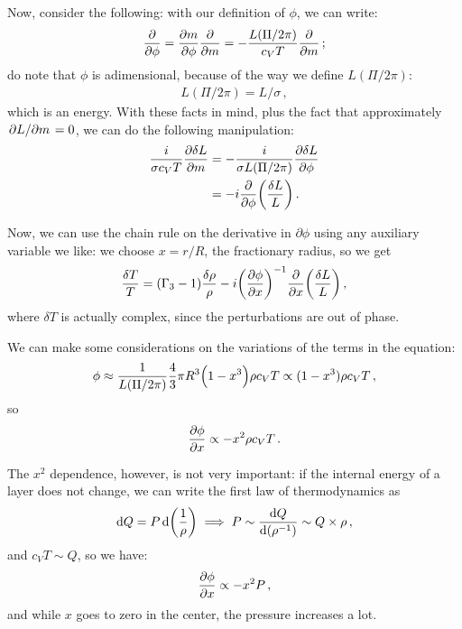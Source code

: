 \documentclass[main.tex]{subfiles}
\begin{document}
Now, consider the following: with our definition of \(\phi \), we can write: 
%
\begin{align}
\pdv{}{\phi } = \pdv{m}{\phi } \pdv{}{m}
= - \frac{L(\Pi /2\pi )}{c_V T} \pdv{}{m}
\,;
\end{align}
%
do note that \(\phi \) is adimensional, because of the way we define \(L(\Pi / 2 \pi )\):
%
\begin{align}
L(\Pi / 2\pi ) = L / \sigma 
\,,
\end{align}
%
which is an energy. With these facts in mind, plus the fact that approximately \(\pdv*{L}{m} = 0\), we can do the following manipulation: 
%
\begin{align}
\frac{i}{\sigma c_V T} \pdv{ \delta L}{m}
&= - \frac{i }{\sigma L(\Pi / 2 \pi ) } \pdv{ \delta L }{\phi }  \\
&= -i \pdv{}{\phi } \qty(\frac{ \delta L}{L})
\,.
\end{align}

Now, we can use the chain rule on the derivative in \(\partial \phi \) using any auxiliary variable we like: we choose \(x = r/ R\), the fractionary radius, so we get 
%
\begin{equation} \label{eq:temperature-evolution-transition-region}
  \frac{\delta T}{T} = (\Gamma_3 -1 ) \frac{\delta \rho }{\rho } - i \qty(\pdv{\phi }{x} )^{-1} \pdv{}{x} \qty(\frac{\delta L}{L})
\,,
\end{equation}
%
where \(\delta T\) is actually complex, since the perturbations are out of phase.

We can make some considerations on the variations of the terms in the equation: 
%
\begin{align}
\phi \approx \frac{1}{L(\Pi / 2 \pi )}
\frac{4}{3} \pi R^3 \qty(1 - x^{3}) \rho c_V T
\propto (1-x^3) \rho c_V T
\,,
\end{align}
%
so 
%
\begin{align}
\pdv{\phi }{x} \propto - x^2 \rho c_V T
\,.
\end{align}

The \(x^2\) dependence, however, is not very important: if the internal energy of a layer does not change, we can write the first law of thermodynamics as 
%
\begin{align}
\dd{Q} = P \dd{\qty(\frac{1}{\rho })} 
\implies 
P \sim \dv{Q}{ \qty(\rho^{-1})} \sim Q \times \rho 
\,,
\end{align}
%
and \(c_V T \sim Q\), so we have: 
%
\begin{align}
\pdv{\phi }{x} \propto - x^2 P
\,,
\end{align}
%
and while \(x\) goes to zero in the center, the pressure increases a lot. 
\end{document}
